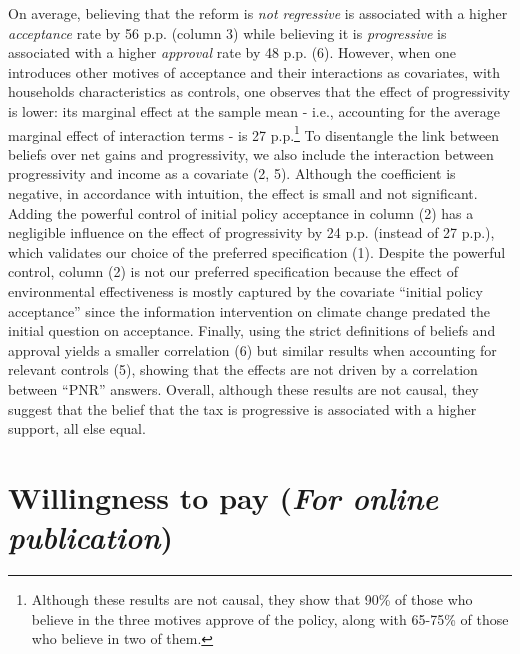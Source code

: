 \documentclass[12pt]{article} %
\begin{document}
\begin{appendices}
On average, believing that the reform is \textit{not regressive} is associated with a higher \textit{acceptance} rate by 56 p.p. (column 3) while believing it is \textit{progressive} is associated with a higher \textit{approval} rate by 48 p.p. (6). However, when one introduces other motives of acceptance and their interactions as covariates, with households characteristics as controls, one observes that the effect of progressivity is lower: its marginal effect at the sample mean - i.e., accounting for the average marginal effect of interaction terms - is 27 p.p.\footnote{Although these results are not causal, they show that 90\% of those who believe in the three motives approve of the policy, along with 65-75\% of those who believe in two of them.} To disentangle the link between beliefs over net gains and progressivity, we also include the interaction between progressivity and income as a covariate (2, 5). Although the coefficient is negative, in accordance with intuition, the effect is small and not significant. Adding the powerful control of initial policy acceptance in column (2) has a negligible influence on the effect of progressivity by 24 p.p. (instead of 27 p.p.), which validates our choice of the preferred specification (1). Despite the powerful control, column (2) is not our preferred specification because the effect of environmental effectiveness is mostly captured by the covariate ``initial policy acceptance'' since the information intervention on climate change predated the initial question on acceptance. Finally, using the strict definitions of beliefs and approval yields a smaller correlation (6) but similar results when accounting for relevant controls (5), showing that the effects are not driven by a correlation between ``PNR'' answers. Overall, although these results are not causal, they suggest that the belief that the tax is progressive is associated with a higher support, all else equal.


\section{Willingness to pay  (\emph{For online publication})}\label{sec:WTP}


\end{appendices}
\end{document}
